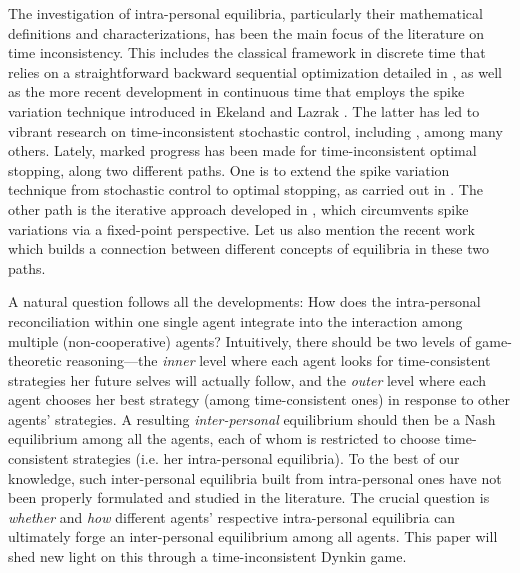 \documentclass[11pt,reqno]{article}
\numberwithin{equation}{section}
\begin{document}
The investigation of intra-personal equilibria, particularly their mathematical definitions and characterizations, has been the main focus of the literature on time inconsistency. This includes the classical framework in discrete time that relies on a straightforward backward sequential optimization detailed in \cite{Pollak68}, as well as the more recent development in continuous time that employs the spike variation technique introduced in Ekeland and Lazrak \cite{EL06}. The latter has led to vibrant research on time-inconsistent stochastic control, including \cite{EP08, EMP12, BMZ14, BKM17, Yong12}, among many others. 
Lately, marked progress has been made for time-inconsistent optimal stopping, along two different paths. One is to extend the spike variation technique from stochastic control to optimal stopping, as carried out in \cite{EWZ18, CL18, CL20}. The other path is the iterative approach developed in \cite{HN18, HNZ20, HY19}, which circumvents spike variations via a fixed-point perspective. Let us also mention the recent work \cite{https://doi.org/10.1111/mafi.12293} which builds a connection between different concepts of equilibria in these two paths.

A natural question follows all the developments: How does the intra-personal reconciliation within one single agent integrate into the interaction among multiple (non-cooperative) agents? Intuitively, there should be two levels of game-theoretic reasoning---the {\it inner} level where each agent looks for time-consistent strategies her future selves will actually follow, and the {\it outer} level where each agent chooses her best strategy (among time-consistent ones) in response to other agents' strategies. A resulting {\it inter-personal} equilibrium should then be a Nash equilibrium among all the agents, each of whom is restricted to choose time-consistent strategies (i.e. her intra-personal equilibria). To the best of our knowledge, such inter-personal equilibria built from intra-personal ones have not been properly formulated and studied in the literature. 
The crucial question is {\it whether} and {\it how} different agents' respective intra-personal equilibria can ultimately forge an inter-personal equilibrium among all agents. This paper will shed new light on this through a time-inconsistent Dynkin game. 
\end{document}
